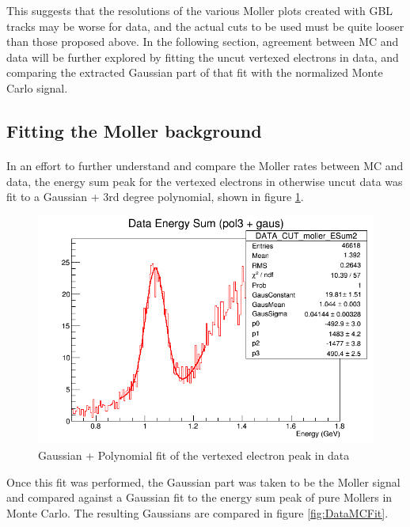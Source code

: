 \documentclass{article}
\begin{document}
This suggests that the resolutions of the various Moller plots created with GBL tracks may be worse for data, and the actual cuts to be used must be quite looser than those proposed above. In the following section, agreement between MC and data will be further explored by fitting the uncut vertexed electrons in data, and comparing the extracted Gaussian part of that fit with the normalized Monte Carlo signal.

\subsection{Fitting the Moller background}
	\paragraph{}
	In an effort to further understand and compare the Moller rates between MC and data, the energy sum peak for the vertexed electrons in otherwise uncut data was fit to a Gaussian + 3rd degree polynomial, shown in figure \ref{fig:BGFit}.

	\begin{figure}[H] 
  	\includegraphics[width=\linewidth]{DataPolGaus.png}
  	\caption{Gaussian + Polynomial fit of the vertexed electron peak in data}
	\label{fig:BGFit}
	\end{figure}

	Once this fit was performed, the Gaussian part was taken to be the Moller signal and compared against a Gaussian fit to the energy sum peak of pure Mollers in Monte Carlo. The resulting Gaussians are compared in figure \ref{fig:DataMCFit}.
 
\end{document}
